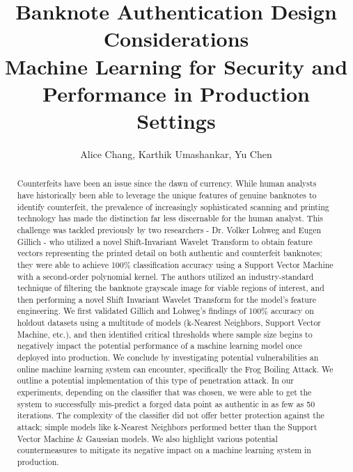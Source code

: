 \documentclass{article}
\begin{document}
\title{%
  \textbf{Banknote Authentication Design Considerations} \\
  \large Machine Learning for Security and  \\
    Performance in Production Settings}
\author{Alice Chang, Karthik Umashankar, Yu Chen}
\maketitle

\begin{abstract}
Counterfeits have been an issue since the dawn of currency. While human analysts have historically been able to leverage the unique features of genuine banknotes to identify counterfeit, the prevalence of increasingly sophisticated scanning and printing technology has made the distinction far less discernable for the human analyst. This challenge was tackled previously by two researchers - Dr. Volker Lohweg and Eugen Gillich - who utilized a novel Shift-Invariant Wavelet Transform to obtain feature vectors representing the printed detail on both authentic and counterfeit banknotes; they were able to achieve 100\% classification accuracy using a Support Vector Machine with a second-order polynomial kernel\cite{original_paper}. The authors utilized an industry-standard technique of filtering the banknote grayscale image for viable regions of interest, and then performing a novel Shift Invariant Wavelet Transform for the model's feature engineering. We first validated Gillich and Lohweg's findings of 100\% accuracy on holdout datasets using a multitude of models (k-Nearest Neighbors, Support Vector Machine, etc.), and then identified critical thresholds where sample size begins to negatively impact the potential performance of a machine learning model once deployed into production.
\newline\newline
We conclude by investigating potential vulnerabilities an online machine learning system can encounter, specifically the Frog Boiling Attack. We outline a potential implementation of this type of penetration attack. In our experiments, depending on the classifier that was chosen, we were able to get the system to successfully mis-predict a forged data point as authentic in as few as 50 iterations. The complexity of the classifier did not offer better protection against the attack; simple models like k-Nearest Neighbors performed better than the Support Vector Machine \& Gaussian models.
\newline\newline
We also highlight various potential countermeasures to mitigate its negative impact on a machine learning system in production.
\end{abstract}
\end{document}

